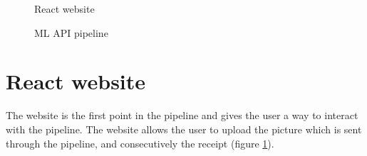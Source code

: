 \begin{figure}[h]
    \caption{React website}
    \label{fig:reactWebsite}
\end{figure}

\begin{figure}[h]
    \caption{ML API pipeline}
    \label{fig:ML API}
\end{figure}

\section{React website}\label{sec:reactWebsite}
The website is the first point in the pipeline and gives the user a way to interact with the pipeline.
The website allows the user to upload the picture which is sent through the pipeline, and consecutively the receipt (figure \ref{fig:reactWebsite}).

